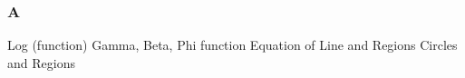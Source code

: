 \documentclass[compress]{beamer}
\newcommand{\sqBullet}[1]{  {\tiny \tiny \tiny \qBoxCol{#1!60}{ }} }
\begin{document}
\begin{frame}\frametitle{A}
{\tiny Log (function)
Gamma, Beta, Phi function
Equation of Line and Regions
Circles and Regions
}
\vspace{3in}
\end{frame}


%
%
%	
%	
%			
%







 
 
\end{document}
